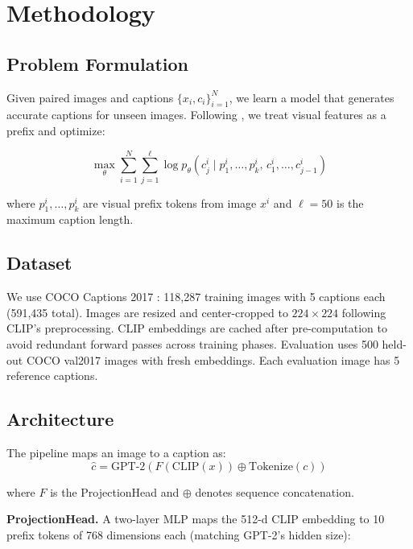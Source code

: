 \documentclass[conference]{IEEEtran}
\begin{document}
\section{Methodology}

\subsection{Problem Formulation}

Given paired images and captions $\{x_i, c_i\}_{i=1}^N$, we learn a model that generates accurate captions for unseen images. Following \cite{mokady2021clipcap}, we treat visual features as a prefix and optimize:

\begin{equation}
\max_\theta \sum_{i=1}^N \sum_{j=1}^\ell \log p_\theta\!\left(c_j^i \mid p_1^i, \ldots, p_k^i,\, c_1^i, \ldots, c_{j-1}^i\right)
\end{equation}

where $p_1^i, \ldots, p_k^i$ are visual prefix tokens from image $x^i$ and $\ell=50$ is the maximum caption length.

\subsection{Dataset}

We use COCO Captions 2017 \cite{chen2015microsoft, lin2014microsoft}: 118,287 training images with 5 captions each (591,435 total). Images are resized and center-cropped to $224 \times 224$ following CLIP's preprocessing. CLIP embeddings are cached after pre-computation to avoid redundant forward passes across training phases. Evaluation uses 500 held-out COCO val2017 images with fresh embeddings. Each evaluation image has 5 reference captions.

\subsection{Architecture}

The pipeline maps an image to a caption as:
\begin{equation}
\hat{c} = \text{GPT-2}\!\left(F\!\left(\text{CLIP}(x)\right) \oplus \text{Tokenize}(c)\right)
\end{equation}

where $F$ is the ProjectionHead and $\oplus$ denotes sequence concatenation.

\textbf{ProjectionHead.} A two-layer MLP maps the 512-d CLIP embedding to 10 prefix tokens of 768 dimensions each (matching GPT-2's hidden size):
\end{document}
